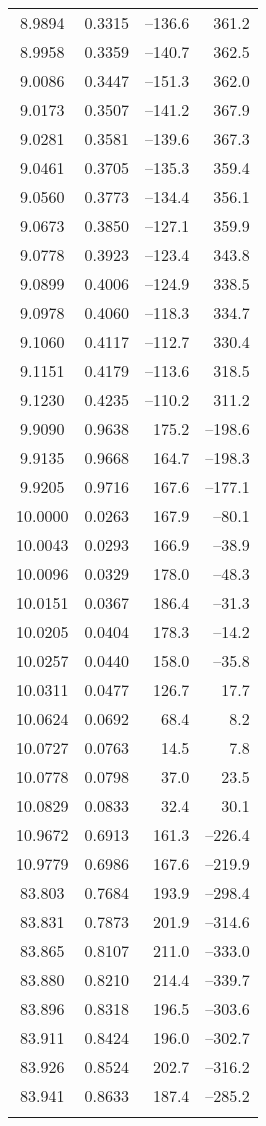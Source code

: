 \documentclass[useAMS,usenatbib]{mnras}                                                                           \usepackage[pdftex]{graphicx}
\begin{document}
\begin{table}
\begin{center}
\begin{footnotesize}
\begin{tabular}{ccrr}
8.9894&	0.3315&	--136.6&	361.2\\ 	   
8.9958&	0.3359&	--140.7&	362.5\\ 	   
9.0086&	0.3447&	--151.3&	362.0\\ 	   
9.0173&	0.3507&	--141.2&	367.9\\ 	   
9.0281&	0.3581&	--139.6&	367.3\\ 	   
9.0461&	0.3705&	--135.3&	359.4\\ 	   
9.0560&	0.3773&	--134.4&	356.1\\ 	   
9.0673&	0.3850&	--127.1&	359.9\\ 	   
9.0778&	0.3923&	--123.4&	343.8\\ 	   
9.0899&	0.4006&	--124.9&	338.5\\ 	   
9.0978&	0.4060&	--118.3&	334.7\\ 	   
9.1060&	0.4117&	--112.7&	330.4\\ 	   
9.1151&	0.4179&	--113.6&	318.5\\ 	   
9.1230& 0.4235&	--110.2&	311.2\\ 	   
9.9090&	0.9638& 175.2&	--198.6\\ 	   
9.9135&	0.9668&	164.7&	--198.3\\ 	   
9.9205&	0.9716&	167.6&	--177.1\\ 	   
10.0000&	0.0263&	167.9&	--80.1\\ 	   
10.0043&	0.0293&	166.9&	--38.9\\ 	   
10.0096&	0.0329&	178.0&	--48.3\\ 	   
10.0151&	0.0367&	186.4&	--31.3\\ 	   
10.0205&	0.0404&	178.3&	--14.2\\ 	   
10.0257&	0.0440&	158.0&	--35.8\\ 	   
10.0311&	0.0477&	126.7&	17.7\\ 	   
10.0624&	0.0692&	68.4&	8.2\\ 	   
10.0727&	0.0763&	14.5&	7.8\\ 	   
10.0778&	0.0798&	37.0&	23.5\\ 	   
10.0829&	0.0833&	32.4&	30.1\\ 	   
10.9672&	0.6913&	161.3&	--226.4\\ 	   
10.9779&	0.6986&	167.6&	--219.9\\ 	   
83.803	&	0.7684	&193.9&	--298.4\\ 	   
83.831	&	0.7873	&201.9&	--314.6\\ 	   
83.865	&	0.8107	&211.0&	--333.0\\ 	   
83.880	&	0.8210	&214.4&	--339.7\\ 	   
83.896	&	0.8318	&196.5&	--303.6\\ 	   
83.911	&	0.8424	&196.0&	--302.7\\ 	   
83.926	&	0.8524	&202.7&	--316.2\\ 	   
83.941	&	0.8633	&187.4&	--285.2\\	 
\hline \\
\end{tabular}
\end{footnotesize}
\end{center}
\end{table}
\end{document}

